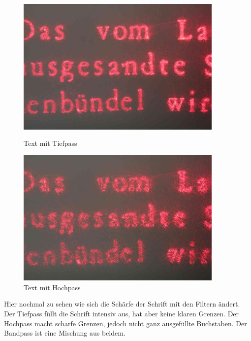             \begin{figure}[H]
                  \begin{minipage}{0.45\textwidth}
                   \centering
                    \includegraphics[width=0.9\textwidth]{Abb/Abb_15.JPG}
                    \caption{Text mit Tiefpass}
                  \end{minipage}\hfill
                  \begin{minipage}{0.45\textwidth}
                   \centering
                    \includegraphics[width=0.9\textwidth]{Abb/Abb_16.JPG}
                    \caption{Text mit Hochpass}
                  \end{minipage}
            \end{figure}

Hier nochmal zu sehen wie sich die Schärfe der Schrift mit den Filtern ändert. Der Tiefpass füllt die Schrift intensiv aus, hat aber keine klaren Grenzen. Der Hochpass macht scharfe Grenzen, jedoch nicht ganz ausgefüllte Buchstaben. Der Bandpass ist eine Mischung aus beidem.


